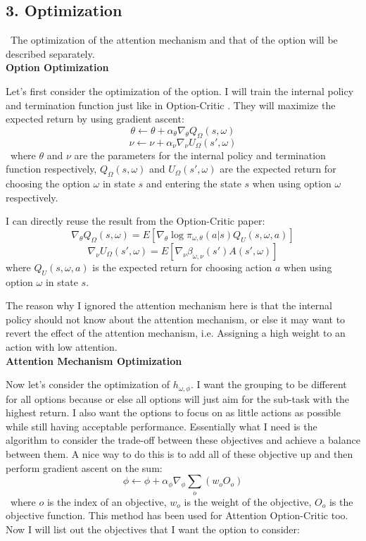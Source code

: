 \documentclass{article}
\begin{document}
	\quad 
	\subsection*{3. Optimization}
	\qquad \ The optimization of the attention mechanism and that of the option will be described separately.\vspace{0.2in}\\
	{\bfseries Option Optimization}\vspace{0.05in}
	
	\quad Let's first consider the optimization of the option. I will train the internal policy and termination function just like in Option-Critic \cite{bacon2016optioncritic}. They will maximize the expected return by using gradient ascent:
	$$\theta \leftarrow \theta + \alpha_\theta \nabla_\theta Q_\Omega(s,\omega)$$
	$$\nu \leftarrow \nu + \alpha_\nu \nabla_\nu U_\Omega(s',\omega)$$
	\qquad \ where $\theta$ and $\nu$ are the parameters for the internal policy and termination function respectively, $Q_\Omega(s,\omega)$ and $U_\Omega(s',\omega)$ are the expected return for choosing the option $\omega$ in state $s$ and entering the state $s$ when using option $\omega$ respectively.
	
	\quad I can directly reuse the result from the Option-Critic paper:
	$$\nabla_\theta Q_\Omega(s,\omega) = E[\nabla_\theta \log \pi_{\omega, \theta}(a|s) Q_U(s,\omega,a)]$$
	$$\nabla_\nu U_\Omega(s',\omega) = E[\nabla_\nu \beta_{\omega, \nu}(s') A(s',\omega)]$$
	\qquad where $Q_U(s,\omega,a)$ is the expected return for choosing action $a$ when using option $\omega$ in state $s$.
	
	\quad The reason why I ignored the attention mechanism here is that the internal policy should not know about the attention mechanism, or else it may want to revert the effect of the attention mechanism, i.e. Assigning a high weight to an action with low attention.\vspace{0.2in}\\
	{\bfseries Attention Mechanism Optimization}\vspace{0.05in}
	
	\quad Now let's consider the optimization of $h_{\omega,\phi}$. I want the grouping to be different for all options because or else all options will just aim for the sub-task with the highest return. I also want the options to focus on as little actions as possible while still having acceptable performance. Essentially what I need is the algorithm to consider the trade-off between these objectives and achieve a balance between them. A nice way to do this is to add all of these objective up and then perform gradient ascent on the sum: $$\phi \leftarrow \phi + \alpha_\phi \nabla_\phi \sum_{o} (w_o O_o)$$ \qquad \ where $o$ is the index of an objective, $w_o$ is the weight of the objective, $O_o$ is the objective function.
	\quad This method has been used for Attention Option-Critic too. Now I will list out the objectives that I want the option to consider: 
	
\end{document}
